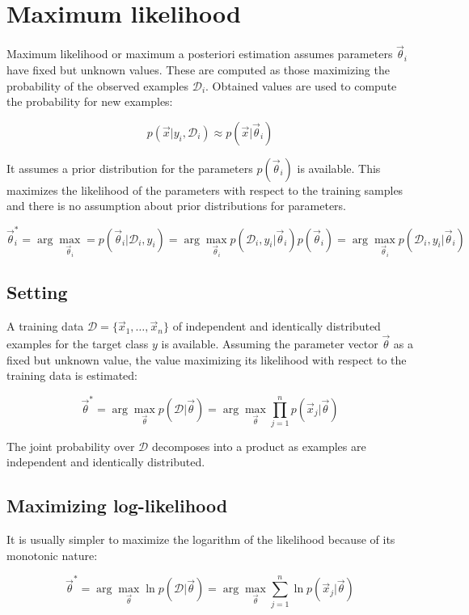 \section{Maximum likelihood}
Maximum likelihood or maximum a posteriori estimation assumes parameters $\vec{\theta}_i$ have fixed but unknown values.
These are computed as those maximizing the probability of the observed examples $\mathcal{D}_i$.
Obtained values are used to compute the probability for new examples:

$$p(\vec{x}|y_i, \mathcal{D}_i)\approx p(\vec{x}|\vec{\theta}_i)$$

It assumes a prior distribution for the parameters $p(\vec{\theta}_i)$ is available.
This maximizes the likelihood of the parameters with respect to the training samples and there is no assumption about prior distributions for parameters.

$$\vec{\theta}_i^* = \arg\max\limits_{\vec{\theta}_i} = p(\vec{\theta}_i|\mathcal{D}_i, y_i) = \arg\max\limits_{\vec{\theta}_i}p(\mathcal{D}_i, y_i|\vec{\theta}_i)p(\vec{\theta}_i) = \arg\max\limits_{\vec{\theta}_i}p(\mathcal{D}_i, y_i|\vec{\theta}_i)$$

	\subsection{Setting}
	A training data $\mathcal{D} = \{\vec{x}_1, \dots, \vec{x}_n\}$ of independent and identically distributed examples for the target class $y$ is available.
	Assuming the parameter vector $\vec{\theta}$ as a fixed but unknown value, the value maximizing its likelihood with respect to the training data is estimated:

	$$\vec{\theta}^* = \arg\max\limits_{\vec{\theta}}p(\mathcal{D}|\vec{\theta}) = \arg\max\limits_{\vec{\theta}}\prod\limits_{j=1}^n p(\vec{x}_j|\vec{\theta})$$

	The joint probability over $\mathcal{D}$ decomposes into a product as examples are independent and identically distributed.

	\subsection{Maximizing log-likelihood}
	It is usually simpler to maximize the logarithm of the likelihood because of its monotonic nature:

	$$\vec{\theta}^* = \arg\max\limits_{\vec{\theta}}\ln p(\mathcal{D}|\vec{\theta}) = \arg\max\limits_{\vec{\theta}}\sum\limits_{j=1}^n\ln p(\vec{x}_j|\vec{\theta})$$

